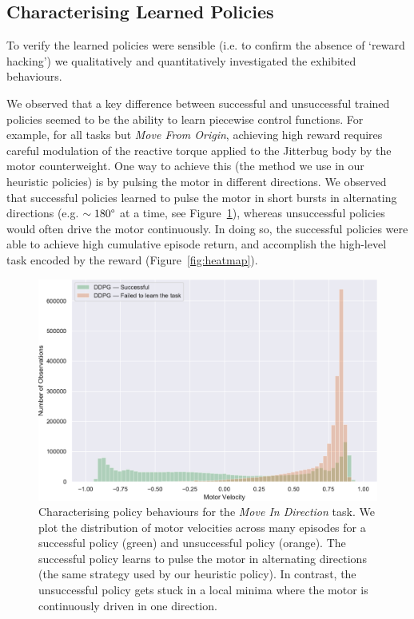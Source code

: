 \documentclass[letterpaper, 10 pt, conference]{ieeeconf}
\begin{document}
\begin{table}[ht]
{
    }
    
\end{table}

\subsection{Characterising Learned Policies}

To verify the learned policies were sensible (i.e. to confirm the absence of `reward hacking') we qualitatively and quantitatively investigated the exhibited behaviours.

We observed that a key difference between successful and unsuccessful trained policies seemed to be the ability to learn piecewise control functions.
For example, for all tasks but \emph{Move From Origin}, achieving high reward requires careful modulation of the reactive torque applied to the Jitterbug body by the motor counterweight.
One way to achieve this (the method we use in our heuristic policies) is by pulsing the motor in different directions.
We observed that successful policies learned to pulse the motor in short bursts in alternating directions (e.g. $\sim180\degree$ at a time, see Figure~\ref{fig:motor-hist}), whereas unsuccessful policies would often drive the motor continuously.
In doing so, the successful policies were able to achieve high cumulative episode return, and accomplish the high-level task encoded by the reward (Figure~\ref{fig:heatmap}).

\begin{figure}[ht]
    \centering
    \includegraphics[width=\linewidth]{fig-motor-hist}
    \caption{
        Characterising policy behaviours for the \emph{Move In Direction} task.
        We plot the distribution of motor velocities across many episodes for a successful policy (green) and unsuccessful policy (orange).
        The successful policy learns to pulse the motor in alternating directions (the same strategy used by our heuristic policy).
        In contrast, the unsuccessful policy gets stuck in a local minima where the motor is continuously driven in one direction.
    }
    \label{fig:motor-hist}
\end{figure}
\end{document}
